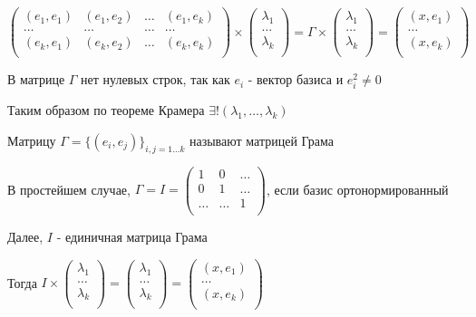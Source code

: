 \documentclass[12pt]{article}
\begin{document}
    $\begin{pmatrix}
    (e_1, e_1) & (e_1, e_2) & \ldots & (e_1, e_k)\\
    \ldots & \ldots & \ldots & \ldots\\
    (e_k, e_1) & (e_k, e_2) & \ldots & (e_k, e_k)\\
    \end{pmatrix} \times 
    \begin{pmatrix}
    \lambda_1\\
    \ldots\\
    \lambda_k \\
    \end{pmatrix} = \Gamma \times \begin{pmatrix}
    \lambda_1\\
    \ldots\\
    \lambda_k \\
    \end{pmatrix} = \begin{pmatrix}
    (x,e_1)\\
    \ldots\\
    (x,e_k) \\
    \end{pmatrix}$

    \Nota В матрице $\Gamma$ нет нулевых строк, так как $e_i$ - вектор базиса и $e_i^2 \neq 0$

    Таким образом по теореме Крамера $\exists! (\lambda_1, \dots, \lambda_k)$

    \hypertarget{grammatrix}{}

    \Def Матрицу $\Gamma = \{(e_i, e_j)\}_{i, j = 1\dots k}$ называют матрицей Грама

    \smallvspace

    В простейшем случае, $\Gamma = I = \begin{pmatrix}
    1 & 0 & \ldots\\
    0 & 1 & \ldots\\
    \ldots & \ldots & 1\\
    \end{pmatrix}$, если базис ортонормированный

    \smallvspace

    Далее, $I$ - единичная матрица Грама

    \Nota Тогда $I \times \begin{pmatrix}
    \lambda_1\\
    \ldots\\
    \lambda_k \\
    \end{pmatrix} = \begin{pmatrix}
    \lambda_1\\
    \ldots\\
    \lambda_k \\
    \end{pmatrix} = \begin{pmatrix}
    (x,e_1)\\
    \ldots\\
    (x,e_k) \\
    \end{pmatrix}$
\end{document}
